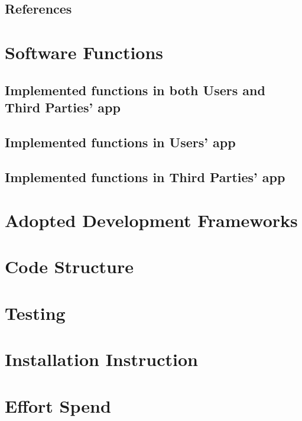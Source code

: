 \documentclass[a4paper,12pt]{report}
\begin{document}
	\section{References}
	

	\chapter{Software Functions}
	\label{ch: Software_Functions}

	\section{Implemented functions in both Users and Third Parties' app }
	

	\section{Implemented functions in Users' app}
	

	\section{Implemented functions in Third Parties' app}
	


	\chapter{Adopted Development Frameworks}
	\label{ch: Adopted_Development_Frameworks}
	


	\chapter{Code Structure} 
	\label{ch:Code_Structure}

	\chapter{Testing}
	\label{ch: Testing}

	\chapter{Installation Instruction} 
	\label{ch: Installation_Instruction}

	

	\appendix
	\chapter{Effort Spend}
\end{document}
